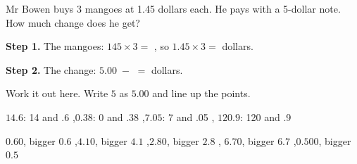 \documentclass[12pt,a4paper]{article}
\newif\ifkey
\newif\iffr
\newcommand{\fr}[1]{\unskip\iffr\par\vspace{1pt}\noindent{\small\itshape\color{black!60}#1}\par\fi}
\begin{document}
\noindent Mr Bowen buys 3 mangoes at 1.45 dollars each. He pays with a 5-dollar note.
How much change does he get?
\fr{Mr Bowen ach\`ete 3 mangues \`a 1.45 dollar pi\`ece. Il paie avec un billet de 5
dollars. Combien de monnaie lui rend-on~?}

\vspace{8pt}
\noindent\hspace*{1.6em}\textbf{Step 1.} The mangoes: \quad $145 \times 3 =$
\blank[1.8cm], \; so $1.45 \times 3 =$ \blank[1.8cm] dollars.
\fr{\'Etape 1~: le prix des mangues.}

\vspace{10pt}
\noindent\hspace*{1.6em}\textbf{Step 2.} The change: \quad $5.00 \;-$ \blank[1.8cm]
$=$ \blank[1.8cm] dollars.
\fr{\'Etape 2~: la monnaie.}

\vspace{12pt}
\noindent Work it out here. Write $5$ as $5.00$ and line up the points.
\fr{Calcule ici. \'Ecris 5 sous la forme 5.00 et pose le calcul virgule sous
virgule.}

\newlength{\finalboxht}
\iffr\setlength{\finalboxht}{8.0cm}\else\setlength{\finalboxht}{7.0cm}\fi
\begin{workspace}[\finalboxht]\end{workspace}

\ifkey
\clearpage


\linespread{1.0}\selectfont
{}

\noindent $14.6$: 14 and .6 \sep $0.38$: 0 and .38 \sep $7.05$: 7 and .05 \sep
$120.9$: 120 and .9

\smallskip
{}

\noindent $0.60$, bigger $0.6$ \sep $4.10$, bigger $4.1$ \sep $2.80$, bigger $2.8$ \sep
$6.70$, bigger $6.7$ \sep $0.500$, bigger $0.5$
\end{document}
